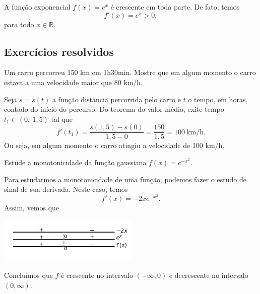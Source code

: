 \begin{ex}
  A função exponencial $f(x) = e^x$ é crescente em toda parte. De fato, temos
  \begin{equation}
    f'(x) = e^x > 0,
  \end{equation}
  para todo $x\in\mathbb{R}$.
\end{ex}

\subsection*{Exercícios resolvidos}

\begin{exeresol}
  Um carro percorreu 150 km em 1h30min. Mostre que em algum momento o carro estava a uma velocidade maior que 80 km/h.
\end{exeresol}
\begin{resol}
  Seja $s=s(t)$ a função distância percorrida pelo carro e $t$ o tempo, em horas, contado do início do percurso. Do teorema do valor médio, exite tempo $t_1\in (0,~1,5)$ tal que
  \begin{equation}
    f'(t_1) = \frac{s(1,5)-s(0)}{1,5-0} = \frac{150}{1,5} = 100~\text{km/h}.
  \end{equation}
  Ou seja, em algum momento o carro atingiu a velocidade de 100 km/h.
\end{resol}

\begin{exeresol}
  Estude a monotonicidade da função gaussiana $f(x) = e^{-x^2}$.  
\end{exeresol}
\begin{resol}
  Para estudarmos a monotonicidade de uma função, podemos fazer o estudo de sinal de sua derivada. Neste caso, temos
  \begin{equation}
    f'(x) = -2xe^{-x^2}.
  \end{equation}
  Assim, vemos que
  \begin{center}
    \includegraphics[width=0.5\textwidth]{./cap_apderiv/dados/fig_exeresol_gauss_estsinal/fig_exeresol_gauss_estsinal}
  \end{center}
  Concluímos que $f$ é crescente no intervalo $(-\infty, 0)$ e decrescente no intervalo $(0, \infty)$.
\end{resol}

